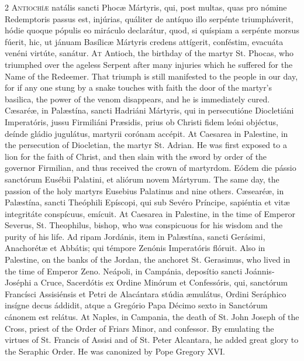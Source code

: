 \begin{paracol}{2}
\lettrine[lines=2]{A}{ntiochíæ} natális sancti Phocæ Mártyris, qui, 
 post multas, quas pro nómine Redemptoris passus est, injúrias, quáliter de 
 antíquo illo serpénte triumpháverit, hódie quoque pópulis eo miráculo 
 declarátur, quod, si quíspiam a serpénte morsus fúerit, hic, ut jánuam 
 Basílicæ Mártyris credens attígerit, conféstim, evacuáta venéni virtúte, 
 sanátur.
\switchcolumn
{}
\lettrine[lines=2]{A}{t} Antioch, the birthday of the martyr St. Phocas, who triumphed over the 
 ageless Serpent after many injuries which he suffered for the Name of the 
 Redeemer. That triumph is still manifested to the people in our day, 
 for if any one stung by a snake touches with faith the door of the martyr's 
 basilica, the power of the venom disappears, and he is immediately cured.
\switchcolumn*
{}
Cæsaréæ, in Palæstína, sancti Hadriáni Mártyris, 
 qui in persecutióne Diocletiáni Imperatóris, jussu Firmiliáni Præsidis, 
 prius ob Christi fidem leóni objéctus, deínde gládio jugulátus, martyrii 
 corónam accépit.
\switchcolumn
{}
At Caesarea in Palestine, in the persecution of Diocletian, the martyr St. 
 Adrian. He was first exposed to a lion for the faith of Christ, and 
 then slain with the sword by order of the governor Firmilian, and thus 
 received the crown of martyrdom.
\switchcolumn*
{}
Eódem die pássio sanctórum Eusébii Palatini, et aliórum novem Mártyrum.
\switchcolumn
{}
The same day, the passion of the holy martyrs Eusebius Palatinus and nine 
 others.
\switchcolumn*
{}
Cæsearéæ, in Palæstína, sancti Theóphili 
 Epíscopi, qui sub Sevéro Príncipe, sapiéntia et vitæ integritáte conspícuus, 
 emícuit.
\switchcolumn
{}
At Caesarea in Palestine, in the time of Emperor Severus, St. Theophilus, 
 bishop, who was conspicuous for his wisdom and the purity of his life.
\switchcolumn*
{}
Ad ripam Jordánis, item in Palæstína, sancti 
 Gerásimi, Anachorétæ et Abbátis; qui témpore Zenónis Imperatóris flóruit.
\switchcolumn
{}
Also in Palestine, on the banks of the Jordan, the anchoret St. Gerasimus, 
 who lived in the time of Emperor Zeno.
\switchcolumn*
{}
Neápoli, in Campánia, deposítio sancti Joánnis-Joséphi a Cruce, Sacerdótis ex
  Ordine Minórum et Confessóris, qui, sanctórum Francísci Assisiénsis et Petri
  de Alacántara stúdia æmulátus, Ordini Seráphico insígne decus áddidit, atque
  a Gregório Papa Décimo sexto in Sanctórum cánonem est relátus.
\switchcolumn
{}
At Naples, in Campania, the death of St. John Joseph of the Cross, priest of 
 the Order of Friars Minor, and confessor. By emulating the virtues of 
 St. Francis of Assisi and of St. Peter Alcantara, he added great glory to 
 the Seraphic Order. He was canonized by Pope Gregory XVI.
\switchcolumn*
{}
\end{paracol}


